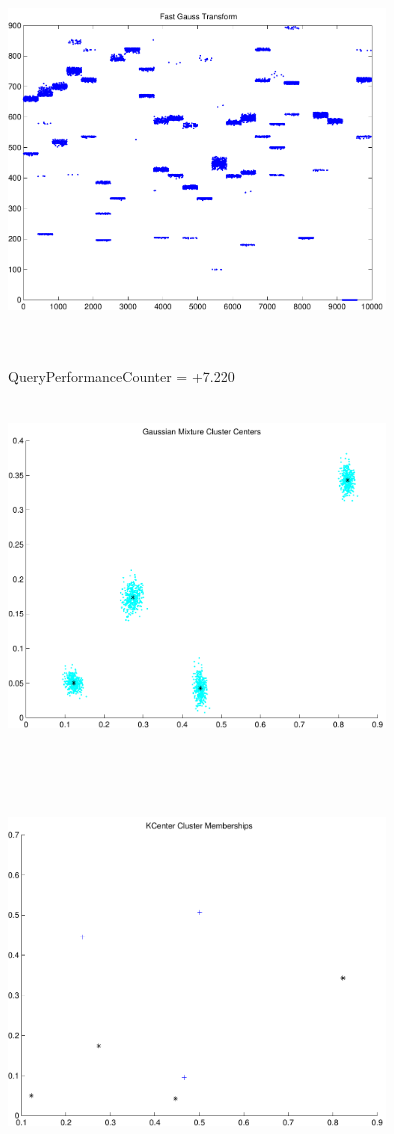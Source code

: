\documentclass[9pt]{article}
\theoremstyle{plain}
\theoremstyle{definition}
\theoremstyle{remark}
\numberwithin{equation}{section}
\begin{document}
\includegraphics[width=10.0cm,height=10.0cm]{FGT24_Centers.pdf}

QueryPerformanceCounter  =  +7.220
\includegraphics[width=10.0cm,height=10.0cm]{GaussianMixture_ClusterCenters4_Centers.pdf}

\includegraphics[width=10.0cm,height=10.0cm]{KCenterClusterMemberships_4_Centers.pdf}
\end{document}
